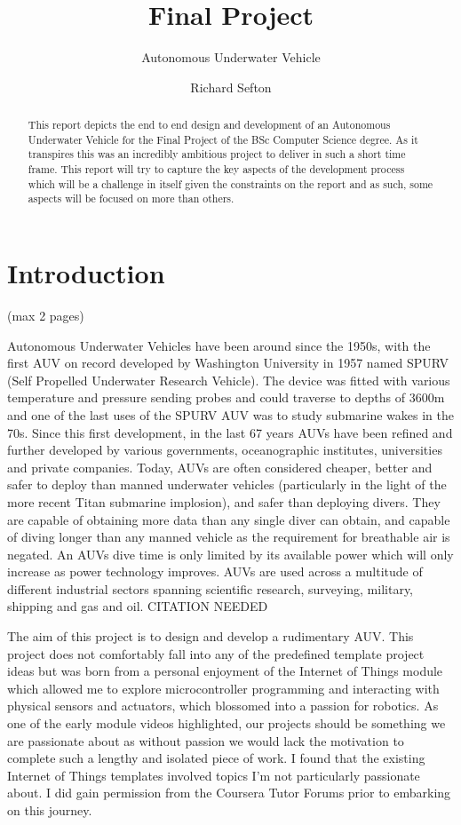 \documentclass[11pt,a4paper,titlepage]{report}
\title{Final Project}
\subtitle{Autonomous Underwater Vehicle}
\author{Richard Sefton}
\begin{document}
	\maketitle
	\tableofcontents
	
	\begin{abstract}
		This report depicts the end to end design and development of an Autonomous Underwater Vehicle for the Final Project of the BSc Computer Science degree. As it transpires this was an incredibly ambitious project to deliver in such a short time frame. This report will try to capture the key aspects of the development process which will be a challenge in itself given the constraints on the report and as such, some aspects will be focused on more than others.  
	\end{abstract}
	
	\chapter*{Introduction} (max 2 pages)
	
	Autonomous Underwater Vehicles have been around since the 1950s, with the first AUV on record developed by Washington University in 1957 named SPURV\cite{SPURV} (Self Propelled Underwater Research Vehicle). The device was fitted with various temperature and pressure sending probes and could traverse to depths of 3600\unit{\meter} and one of the last uses of the SPURV AUV was to study submarine wakes in the 70s. Since this first development, in the last 67 years AUVs have been refined and further developed by various governments, oceanographic institutes, universities and private companies. Today, AUVs are often considered cheaper, better and safer to deploy than manned underwater vehicles (particularly in the light of the more recent Titan submarine implosion\cite{TITAN_IMPLOSION}), and safer than deploying divers. They are capable of obtaining more data than any single diver can obtain, and capable of diving longer than any manned vehicle as the requirement for breathable air is negated. An AUVs dive time is only limited by its available power which will only increase as power technology improves. AUVs are used across a multitude of different industrial sectors spanning scientific research, surveying, military, shipping and gas and oil. CITATION NEEDED
	
	The aim of this project is to design and develop a rudimentary AUV. This project does not comfortably fall into any of the predefined template project ideas but was born from a personal enjoyment of the Internet of Things module which allowed me to explore microcontroller programming and interacting with physical sensors and actuators, which blossomed into a passion for robotics. As one of the early module videos highlighted, our projects should be something we are passionate about as without passion we would lack the motivation to complete such a lengthy and isolated piece of work\cite{COURSERA_PROJECT_VIDEO}. I found that the existing Internet of Things templates involved topics I'm not particularly passionate about. I did gain permission from the Coursera Tutor Forums prior to embarking on this journey\cite{COURSERA_PROJECT_PERMISSION}.
	
\end{document}
